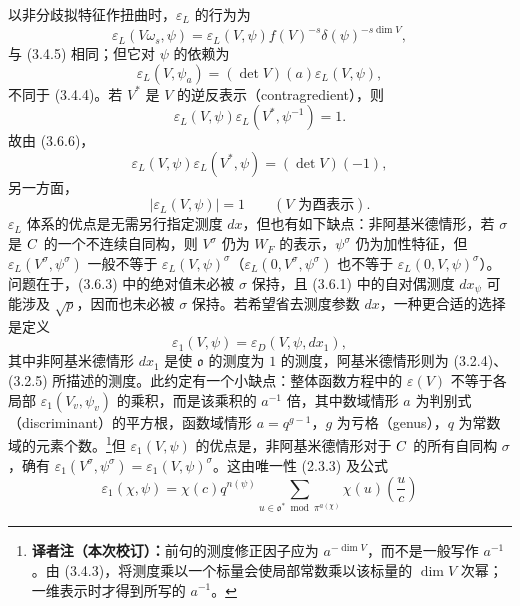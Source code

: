 以非分歧拟特征作扭曲时，$\varepsilon_L$ 的行为为
\begin{equation}
 \varepsilon_L(V\omega_s,\psi)=\varepsilon_L(V,\psi)f(V)^{-s}\delta(\psi)^{-s\dim V},\tag{3.6.5}
\end{equation}
与 (3.4.5) 相同；但它对 $\psi$ 的依赖为
\begin{equation}
 \varepsilon_L(V,\psi_a)=(\det V)(a)\varepsilon_L(V,\psi),\tag{3.6.6}
\end{equation}
不同于 (3.4.4)。若 $V^*$ 是 $V$ 的逆反表示（contragredient），则
\begin{equation}
 \varepsilon_L(V,\psi)\varepsilon_L(V^*,\psi^{-1})=1.\tag{3.6.7}
\end{equation}
故由 (3.6.6)，
\begin{equation}
 \varepsilon_L(V,\psi)\varepsilon_L(V^*,\psi)=(\det V)(-1),\tag{3.6.8}
\end{equation}
另一方面，
\begin{equation}
 |\varepsilon_L(V,\psi)|=1\qquad(V\text{ 为酉表示}).\tag{3.6.9}
\end{equation}
$\varepsilon_L$ 体系的优点是无需另行指定测度 $dx$，但也有如下缺点：非阿基米德情形，若 $\sigma$ 是 $C$ 的一个不连续自同构，则 $V^\sigma$ 仍为 $W_F$ 的表示，$\psi^\sigma$ 仍为加性特征，但 $\varepsilon_L(V^\sigma,\psi^\sigma)$ 一般不等于 $\varepsilon_L(V,\psi)^\sigma$（$\varepsilon_L(0,V^\sigma,\psi^\sigma)$ 也不等于 $\varepsilon_L(0,V,\psi)^\sigma$）。问题在于，(3.6.3) 中的绝对值未必被 $\sigma$ 保持，且 (3.6.1) 中的自对偶测度 $dx_\psi$ 可能涉及 $\sqrt p$，因而也未必被 $\sigma$ 保持。若希望省去测度参数 $dx$，一种更合适的选择是定义
\begin{equation}
 \varepsilon_1(V,\psi)=\varepsilon_D(V,\psi,dx_1),\tag{3.6.10}
\end{equation}
其中非阿基米德情形 $dx_1$ 是使 $\mathfrak o$ 的测度为 $1$ 的测度，阿基米德情形则为 (3.2.4)、(3.2.5) 所描述的测度。此约定有一个小缺点：整体函数方程中的 $\varepsilon(V)$ 不等于各局部 $\varepsilon_1(V_v,\psi_v)$ 的乘积，而是该乘积的 $a^{-1}$ 倍，其中数域情形 $a$ 为判别式（discriminant）的平方根，函数域情形 $a=q^{g-1}$，$g$ 为亏格（genus），$q$ 为常数域的元素个数。\footnote{\textbf{译者注（本次校订）：}前句的测度修正因子应为 $a^{-\dim V}$，而不是一般写作 $a^{-1}$。由 (3.4.3)，将测度乘以一个标量会使局部常数乘以该标量的 $\dim V$ 次幂；一维表示时才得到所写的 $a^{-1}$。}但 $\varepsilon_1(V,\psi)$ 的优点是，非阿基米德情形对于 $C$ 的所有自同构 $\sigma$，确有 $\varepsilon_1(V^\sigma,\psi^\sigma)=\varepsilon_1(V,\psi)^\sigma$。这由唯一性 (2.3.3) 及公式
\begin{equation}
 \varepsilon_1(\chi,\psi)=\chi(c)q^{n(\psi)}
 \sum_{u\in\mathfrak o^*\bmod\pi^{a(\chi)}}\chi(u)\left(\frac uc\right)\tag{3.6.11}
\end{equation}
